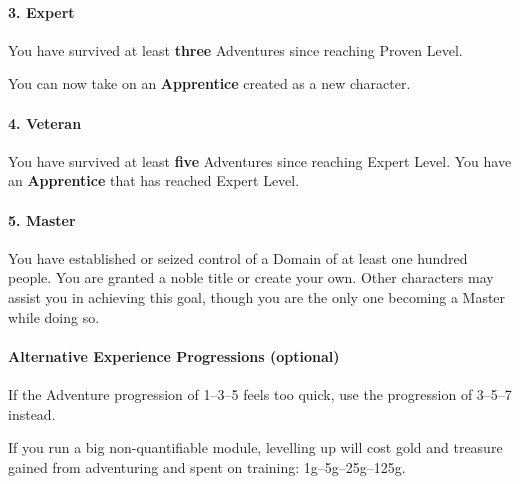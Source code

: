 \documentclass[itdr]{subfiles}
\begin{document}
\paragraph{3. Expert}
You have survived at least \textbf{three} Adventures since reaching Proven Level.

You can now take on an \textbf{Apprentice} created as a new character.

\paragraph{4. Veteran}
You have survived at least \textbf{five} Adventures since reaching Expert Level. You have an \textbf{Apprentice} that has reached Expert Level.

\paragraph{5. Master}
You have established or seized control of a Domain of at least one hundred people. You are granted a noble title or create your own. Other characters may assist you in achieving this goal, though you are the only one becoming a Master while doing so.

\vfill
\begin{dbox}
	\paragraph{Alternative Experience Progressions (optional)}
	If the Adventure progression of 1--3--5 feels too quick, use the progression of 3--5--7 instead.

	If you run a big non-quantifiable module, levelling up will cost gold and treasure gained from adventuring and spent on training: 1g--5g--25g--125g.
\end{dbox}
\end{document}
